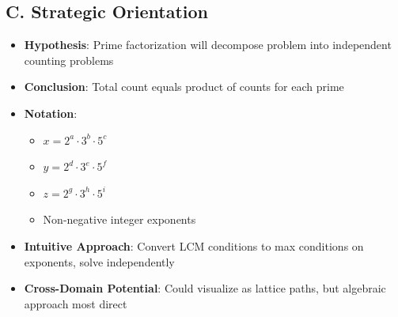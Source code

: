 \documentclass[12pt]{article}
\begin{document}
\begin{problemconfigbox}
\subsection*{C. Strategic Orientation}
\begin{itemize}[leftmargin=*]
    \item \textbf{Hypothesis}: Prime factorization will decompose problem into independent counting problems
    \item \textbf{Conclusion}: Total count equals product of counts for each prime
    \item \textbf{Notation}: 
    \begin{itemize}
        \item $x = 2^a \cdot 3^b \cdot 5^c$
        \item $y = 2^d \cdot 3^e \cdot 5^f$
        \item $z = 2^g \cdot 3^h \cdot 5^i$
        \item Non-negative integer exponents
    \end{itemize}
    \item \textbf{Intuitive Approach}: Convert LCM conditions to max conditions on exponents, solve independently
    \item \textbf{Cross-Domain Potential}: Could visualize as lattice paths, but algebraic approach most direct
\end{itemize}
\end{problemconfigbox}
\end{document}
